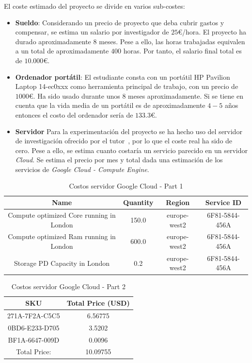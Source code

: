 El coste estimado del proyecto se divide en varios sub-costes:
\begin{itemize}
      \item \textbf{Sueldo}: Considerando un precio de proyecto que deba cubrir gastos y compensar, se estima un salario por investigador de $25$€/hora. El proyecto ha durado aproximadamente $8$ meses. Pese a ello, las horas trabajadas equivalen a un total de aproximadamente $400$ horas. Por tanto, el salario final total es de $10.000$€.
      \item \textbf{Ordenador portátil}: El estudiante consta con un portátil HP Pavilion Laptop 14-ec0xxx como herramienta principal de trabajo, con un precio de $1000$€. Ha sido usado durante unos $8$ meses aproximadamente. Si se tiene en cuenta que la vida media de un portátil es de aproximadamente $4-5$ años~\cite{woidasky_use_2021} entonces el costo del ordenador sería de $133.3$€.
      \item \textbf{Servidor} Para la experimentación del proyecto se ha hecho uso del servidor de investigación ofrecido por el tutor~\cite{citicugr}, por lo que el coste real ha sido de cero. Pese a ello, se estima cuanto costaría un servicio parecido en un servidor \textit{Cloud}. Se estima el precio por mes y total dada una estimación de los servicios de \textit{Google Cloud - Compute Engine}.
\end{itemize}
\begin{table}[H]
      \centering
      \begin{tabular}{|c|c|c|c|}
            \hline
            \textbf{Name}                            & \textbf{Quantity} & \textbf{Region} & \textbf{Service ID} \\
            \hline
            Compute optimized Core running in London & 150.0             & europe-west2    & 6F81-5844-456A      \\
            Compute optimized Ram running in London  & 600.0             & europe-west2    & 6F81-5844-456A      \\
            Storage PD Capacity in London            & 0.2               & europe-west2    & 6F81-5844-456A      \\
            \hline
      \end{tabular}
      \caption{Costos servidor Google Cloud - Part 1}
      \label{tab:server_costs_part1}
\end{table}
\begin{table}[H]
      \centering
      \begin{tabular}{|c|c|}
            \hline
            \textbf{SKU}   & \textbf{Total Price (USD)} \\
            \hline
            271A-7F2A-C5C5 & 6.56775                    \\
            0BD6-E233-D705 & 3.5202                     \\
            BF1A-6647-009D & 0.0096                     \\
            \hline
            Total Price:   & 10.09755                   \\
            \hline
      \end{tabular}
      \caption{Costos servidor Google Cloud - Part 2}
      \label{tab:server_costs_part2}
\end{table}
